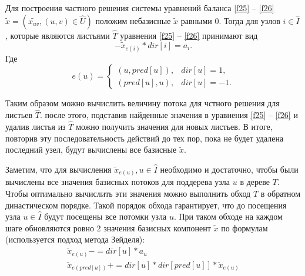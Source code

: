 \documentclass[14pt]{extarticle}%
\begin{document}
Для построения частного решения системы уравнений баланса \eqref{f25} -- \eqref{f26} $\widetilde x=(\widetilde{x_{uv}},(u,v)\in \widehat{U})$ положим небазисные $\widetilde{x}$ равными $0$. Тогда для узлов $i\in \widehat{I}$, которые являются листьями $\widehat{T}$ уравнения \eqref{f25} -- \eqref{f26} принимают вид 
\begin{equation}\label{f241}
-\widetilde{x}_{e(i)}*dir[i]=a_i.
\end{equation}
Где 
\begin{equation*}
e(u)=\left\{
\begin{matrix}
(u, pred[u]),& dir[u]=1,\\
(pred[u],u),& dir[u]=-1.
\end{matrix}
\right.
\end{equation*}

Таким образом можно вычислить величину потока для чстного решения для листьев $\widehat{T}$. после этого, подставив найденные значения в уравнения \eqref{f25} -- \eqref{f26} и удалив листья из $\widehat{T}$ можно получить значения для новых листьев. В итоге, повторив эту последовательность действий до тех пор, пока не будет удалена последний узел, будут вычислены все базисные $\widetilde x$.

Заметим, что для вычисления $\widetilde{x}_{e(u)}, u\in \widehat{I}$ необходимо и достаточно, чтобы были вычислены все значения базисных потоков для поддерева узла $u$ в дереве $T$. Чтобы оптимально вычислить эти значения можно выполнить обход $T$ в обратном династическом порядке. Такой порядок обхода гарантирует, что до посещения узла $u\in \widehat{I}$ будут посещены все потомки узла $u$. При таком обходе на каждом шаге обновляются ровно 2 значения базисных компонент $\widetilde x$ по формулам (используется подход метода Зейделя):
\begin{equation}\label{f242}
\begin{gathered}
\widetilde{x}_{e(u)}-= dir[u]*a_u\\
\widetilde{x}_{e(pred[u])}+= dir[u]*dir[pred[u]]*\widetilde{x}_{e(u)}
\end{gathered}
\end{equation}



\end{document}

